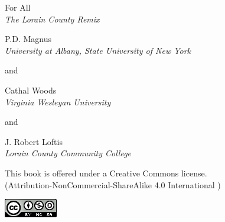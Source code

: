 \setlength{\parindent}{0em}
\thispagestyle{empty}


%

%
{\huge For All }\\ \vspace{24pt}
{\Large \emph{The Lorain County Remix}}\\




\vfill

{\sf P.D. Magnus}\\
\emph{University at Albany, State University of New York}

and

{\sf Cathal Woods}\\
\emph{Virginia Wesleyan University}

and

{\sf J. Robert Loftis}\\
\emph{Lorain County Community College}

\vfill

{\sf
	This book is offered under a Creative Commons license.\\
	(Attribution-NonCommercial-ShareAlike 4.0 International )
}

\includegraphics[width=66pt, height=23pt, keepaspectratio=true]{img/cc-by-nc-sa.png}


